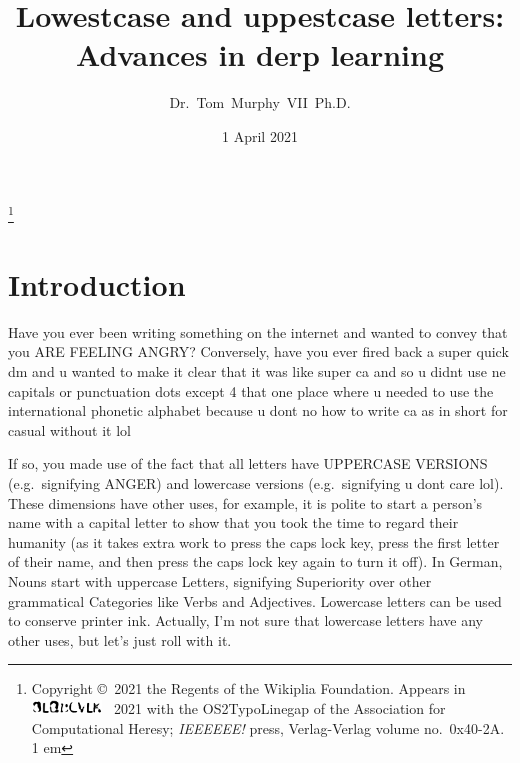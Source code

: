 \documentclass[twocolumn]{article}
\newcommand\upsigbovik{
  \includegraphics[height=1em]{upsigbovik}
}
\begin{document}
\title{Lowestcase and uppestcase letters: Advances in derp learning}
\author{Dr.~Tom~Murphy~VII~Ph.D.}\thanks{
Copyright \copyright\ 2021 the Regents of the Wikiplia Foundation.
Appears in \upsigbovik~2021 with the
OS2TypoLinegap of the Association for Computational Heresy; {\em IEEEEEE!}
press, Verlag-Verlag volume no.~0x40-2A. 1 em}


\newcommand\makelowercase{{\sf make\_lowercase}}
\newcommand\makeuppercase{{\sf make\_uppercase}}

\renewcommand\th{\ensuremath{{}^{\textrm{th}}}}
\newcommand\st{\ensuremath{{}^{\textrm{st}}}}
\newcommand\rd{\ensuremath{{}^{\textrm{rd}}}}
\newcommand\nd{\ensuremath{{}^{\textrm{nd}}}}
\newcommand\at{\ensuremath{\scriptstyle @}}

\renewcommand\paragraph[1]{\smallskip \noindent{\bf #1}\enspace}

\date{1 April 2021}

\maketitle \thispagestyle{empty}

\sloppypar


\section{Introduction}

Have you ever been writing something on the internet and wanted to convey
that you ARE FEELING ANGRY? Conversely, have you ever fired back a super
quick dm and u wanted to make it clear that it was like super ca
and so u didnt use ne capitals or punctuation dots except 4 that one place
where u needed to use the international phonetic alphabet because u dont
no how to write ca as in short for casual without it lol

If so, you made use of the fact that all letters have UPPERCASE
VERSIONS (e.g.~signifying ANGER) and lowercase versions
(e.g.~signifying u dont care lol). These dimensions have other uses,
for example, it is polite to start a person's name with a capital
letter to show that you took the time to regard their humanity (as it
takes extra work to press the caps lock key, press the first letter of
their name, and then press the caps lock key again to turn it off).
In German, Nouns start with uppercase Letters, signifying Superiority
over other grammatical Categories like Verbs and Adjectives. Lowercase
letters can be used to conserve printer ink. Actually, I'm not sure that
lowercase letters have any other uses, but let's just roll with it.
\end{document}
